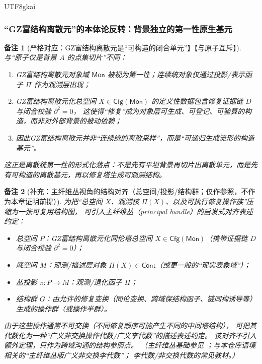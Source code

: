 \documentclass[12pt]{article}
\newtheorem{remark}{备注}[section]
\newcommand{\KouJing}{\texorpdfstring{表述约定}{表述约定}}
\newcommand{\GZMonFull}{\texorpdfstring{GZ富结构离散元}{GZ富结构离散元}}
\newcommand{\GZMon}{\texorpdfstring{GZ富结构离散元}{GZ富结构离散元}}
\newcommand{\GZMonization}{\texorpdfstring{GZ富结构离散元化}{GZ富结构离散元化}}
\begin{document}
\begin{CJK*}{UTF8}{gkai}
\subsubsection{“\GZMonFull{}”的本体论反转：背景独立的第一性原生基元}
\label{subsubsec:tex29-ch14-new-monad}

\begin{remark}[严格对应：\GZMon{}是“可构造的闭合单元”】【与原子互斥】]
与“原子仅是背景 $A$ 的点集切片”不同：
\begin{enumerate}
  \item \GZMon{}对象域 $\mathsf{Mon}$ 被视为第一性；连续统对象仅通过投影/表示函子 $\Pi$ 作为观测层出现；
  \item \GZMonization{}总空间 $X\in\mathsf{Cfg}(\mathsf{Mon})$ 的定义性数据包含修复证据链 $D$ 与闭合校验 $\partial^2=0$，
  这使得“修复”成为对象层可生成、可登记、可验算的构造，而非对外部背景的被动依赖；
  \item 因此\GZMon{}并非“连续统的离散采样”，而是“可递归生成流形的构造基元”。
\end{enumerate}
这正是离散统第一性的形式化落点：不是先有平坦背景再切片出离散单元，而是先有可构造的离散基元，再以修复塔生成可观测结构。
\end{remark}

\begin{remark}[补充：主纤维丛视角的结构对齐（总空间/投影/结构群；仅作参照，不作为本章证明前提）]
为把“总空间 $X$、观测核 $\Pi(X)$、以及可执行修复操作族”压缩为一张可复用结构图，
可引入主纤维丛（principal bundle）的启发式对齐\KouJing：
\begin{itemize}
  \item 总空间 $P$：\GZMonization{}同伦塔总空间 $X\in\mathsf{Cfg}(\mathsf{Mon})$（携带证据链 $D$ 与闭合校验 $\partial^2=0$）；
  \item 底空间 $M$：观测/描述层对象 $\Pi(X)\in\mathsf{Cont}$（或更一般的“现实表象域”）；
  \item 丛投影 $\pi:P\to M$：观测/退化函子 $\Pi$；
  \item 结构群 $G$：由允许的修复变换（同伦变换、跨域保结构函子、链同构诱导等）生成的操作群（或操作半群）。
\end{itemize}
由于这些操作通常不可交换（不同修复顺序可能产生不同的中间塔结构），
可把其代数化为一种“广义非交换操作代数/广义李代数”的描述\KouJing。
该对齐不引入额外定理，只作为跨域沟通的结构参照点。
（主纤维丛基础参见 \cite{Husemoller1994FibreBundles}；与本仓库语境相关的“主纤维丛版广义非交换李代数” \cite{GaoZheng2025GFramework}；
  李代数/非交换代数的常见教材 \cite{Hall2015LieGroups}。）
\end{remark}


\end{CJK*}
\end{document}
